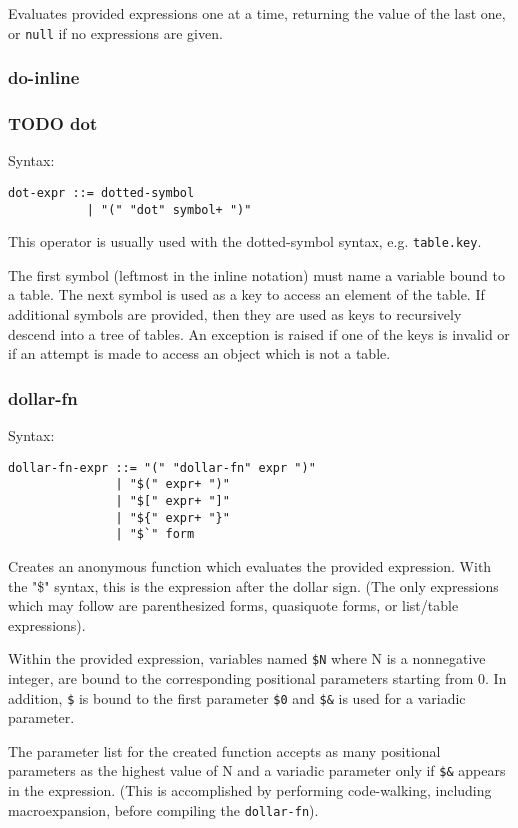\documentclass[11pt]{article}
\begin{document}
Evaluates provided expressions one at a time, returning the value of the last
one, or \texttt{null} if no expressions are given.

\subsubsection{do-inline}
\label{sec:orga9c498c}
\subsubsection{{\bfseries\sffamily TODO} dot}
\label{sec:orgd4f17ad}
Syntax:
\begin{verbatim}
dot-expr ::= dotted-symbol
           | "(" "dot" symbol+ ")"
\end{verbatim}

This operator is usually used with the dotted-symbol syntax, e.g. \texttt{table.key}.

The first symbol (leftmost in the inline notation) must name a variable bound to
a table. The next symbol is used as a key to access an element of the table. If
additional symbols are provided, then they are used as keys to recursively
descend into a tree of tables. An exception is raised if one of the keys is
invalid or if an attempt is made to access an object which is not a table.

\subsubsection{dollar-fn}
\label{sec:org6e1a6d5}
Syntax:
\begin{verbatim}
dollar-fn-expr ::= "(" "dollar-fn" expr ")"
               | "$(" expr+ ")"
               | "$[" expr+ "]"
               | "${" expr+ "}"
               | "$`" form
\end{verbatim}

Creates an anonymous function which evaluates the provided expression. With the
"\$" syntax, this is the expression after the dollar sign. (The only expressions
which may follow are parenthesized forms, quasiquote forms, or list/table
expressions).

Within the provided expression, variables named \texttt{\$N} where N is a nonnegative
integer, are bound to the corresponding positional parameters starting from 0.
In addition, \texttt{\$} is bound to the first parameter \texttt{\$0} and \texttt{\$\&} is used for a
variadic parameter.

The parameter list for the created function accepts as many positional
parameters as the highest value of N and a variadic parameter only if \texttt{\$\&}
appears in the expression. (This is accomplished by performing code-walking,
including macroexpansion, before compiling the \texttt{dollar-fn}).
\end{document}
